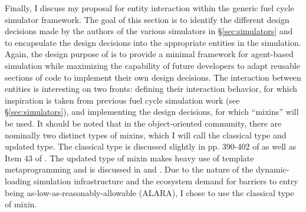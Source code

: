 Finally, I discuss my proposal for entity interaction within the generic fuel
cycle simulator framework. The goal of this section is to identify the different
design decisions made by the authors of the various simulators in
\S\ref{sec:simulators} and to encapsulate the design decisions into the
appropriate entities in the \Cyclus simulation. Again, the design purpose of
\Cyclus is to provide a minimal framework for agent-based simulation while
maximizing the capability of future developers to adapt reusable sections of
code to implement their own design decisions. The interaction between entities
is interesting on two fronts: defining their interaction behavior, for which
inspiration is taken from previous fuel cycle simulation work (see
\S\ref{sec:simulators}), and implementing the design decisions, for which
``mixins'' will be used. It should be noted that in the object-oriented
community, there are nominally two distinct types of mixins, which I will call
the classical type and updated type. The classical type is discussed slightly in
pp. 390-402 of \cite{stroustrup_c++_2000} as well as Item 43 of
\cite{meyers_effective_2005}. The updated type of mixin makes heavy use of
template metaprogramming and is discussed in \cite{ulrich_mixin-based_2001} and
\cite{smaragdakis_mixin_2002}. Due to the nature of the \Cyclus dynamic-loading
simulation infrastructure and the \Cyclus ecosystem demand for barriers to entry
being as-low-as-reasonably-allowable (ALARA), I chose to use the classical type
of mixin.

